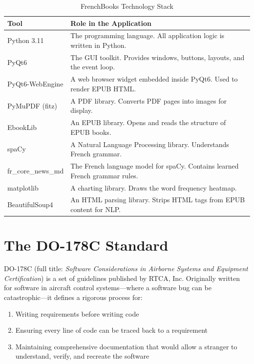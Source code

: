 \documentclass[12pt,oneside]{book}
\begin{document}
\begin{table}[H]
\centering
\caption{FrenchBooks Technology Stack}
\label{tab:stack}
\begin{tabularx}{\textwidth}{l X}
\toprule
\textbf{Tool} & \textbf{Role in the Application} \\
\midrule
Python 3.11 & The programming language. All application logic is written in Python. \\
PyQt6 & The GUI toolkit. Provides windows, buttons, layouts, and the event loop. \\
PyQt6-WebEngine & A web browser widget embedded inside PyQt6. Used to render EPUB HTML. \\
PyMuPDF (fitz) & A PDF library. Converts PDF pages into images for display. \\
EbookLib & An EPUB library. Opens and reads the structure of EPUB books. \\
spaCy & A Natural Language Processing library. Understands French grammar. \\
fr\_core\_news\_md & The French language model for spaCy. Contains learned French grammar rules. \\
matplotlib & A charting library. Draws the word frequency heatmap. \\
BeautifulSoup4 & An HTML parsing library. Strips HTML tags from EPUB content for NLP. \\
\bottomrule
\end{tabularx}
\end{table}

\section{The DO-178C Standard}

DO-178C (full title: \textit{Software Considerations in Airborne Systems and Equipment
Certification}) is a set of guidelines published by RTCA, Inc. Originally written for
software in aircraft control systems—where a software bug can be catastrophic—it defines
a rigorous process for:

\begin{enumerate}
  \item Writing requirements before writing code
  \item Ensuring every line of code can be traced back to a requirement
  \item Maintaining comprehensive documentation that would allow a stranger to
    understand, verify, and recreate the software
\end{enumerate}
\end{document}
